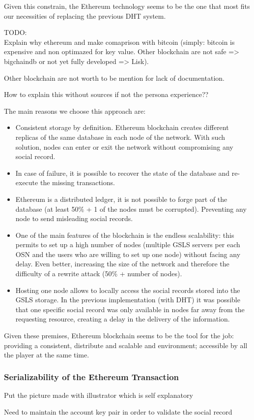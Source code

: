 Given this constrain, the Ethereum technology seems to be the one that most fits our necessities of replacing the previous DHT system.

\begin{notation}
  TODO: \\
  Explain why ethereum and make comaprison with bitcoin (simply: bitcoin is expensive and non optimazed for key value. Other blockchain are not safe => bigchaindb or not yet fully developed => Lisk).

  Other blockchain are not worth to be mention for lack of documentation.

  How to explain this without sources if not the persona experience??
\end{notation}
The main reasons we choose this approach are:

\begin{itemize}
  \item Consistent storage by definition. Ethereum blockchain creates different replicas of the same database in each node of the network. With such solution, nodes can enter or exit the network without compromising any social record.
  \item In case of failure, it is possible to recover the state of the database and re-execute the missing transactions.
  \item Ethereum is a distributed ledger, it is not possible to forge part of the database (at least 50\% + 1 of the nodes must be corrupted). Preventing any node to send misleading social records.
  \item One of the main features of the blockchain is the endless scalability: this permits to set up a high number of nodes (multiple GSLS servers per each OSN and the users who are willing to set up one node) without facing any delay.
  Even better, increasing the size of the network and therefore the difficulty of a rewrite attack (50\% + number of nodes).
  \item Hosting one node allows to locally access the social records stored into the GSLS storage. In the previous implementation (with DHT) it was possible that one specific social record was only available in nodes far away from the requesting resource, creating a delay in the delivery of the information. 
\end{itemize}

Given these premises, Ethereum blockchain seems to be the tool for the job: providing a consistent, distribute and scalable and environment; accessible by all the player at the same time.



\subsubsection{Serializability of the Ethereum Transaction}

Put the picture made with illustrator which is self explanatory


\begin{notation}
  Need to maintain the account key pair in order to validate the social record
\end{notation}